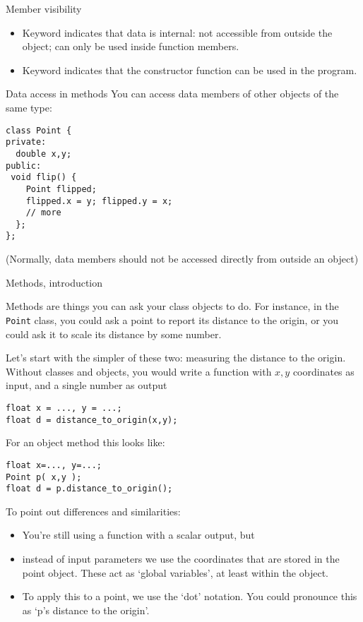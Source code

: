 \begin{block}{Member visibility}
  \begin{itemize}
  \item Keyword  indicates that data is internal:
    not accessible from outside the object;
    can only be used inside function members.
  \item Keyword  indicates that the constructor
    function can be used in the program.
  \end{itemize}
\end{block}

\begin{slide}{Data access in methods}
  \label{sl:member-access-proper}
  You can access data members of other objects of the same type:
\begin{lstlisting}
class Point {
private:
  double x,y;
public:
 void flip() {
    Point flipped;
    flipped.x = y; flipped.y = x;
    // more
  };
};
\end{lstlisting}
  (Normally, data members should not be accessed directly from outside an object)
\end{slide}

 {Methods, introduction}

Methods are things you can ask your class objects to do. For instance,
in the \lstinline{Point} class, you could ask
a point to report its distance to the origin,
or you could ask it to scale its distance by some number.

Let's start with the simpler of these two: measuring the distance to the origin.
Without classes and objects, you would write a function with $x,y$ coordinates
as input,
and a single number as output
\begin{lstlisting}
float x = ..., y = ...;
float d = distance_to_origin(x,y);
\end{lstlisting}

For an object method this looks like:
\begin{lstlisting}
float x=..., y=...;
Point p( x,y );
float d = p.distance_to_origin();
\end{lstlisting}
To point out differences and similarities:
\begin{itemize}
\item
  You're still using a function with a scalar output, but
\item instead of input parameters we use the coordinates
  that are stored in the point object.
  These act as `global variables', at least within the object.
\item To apply this to a point, we use the `dot' notation.
  You could pronounce this as `p's distance to the origin'.
\end{itemize}

